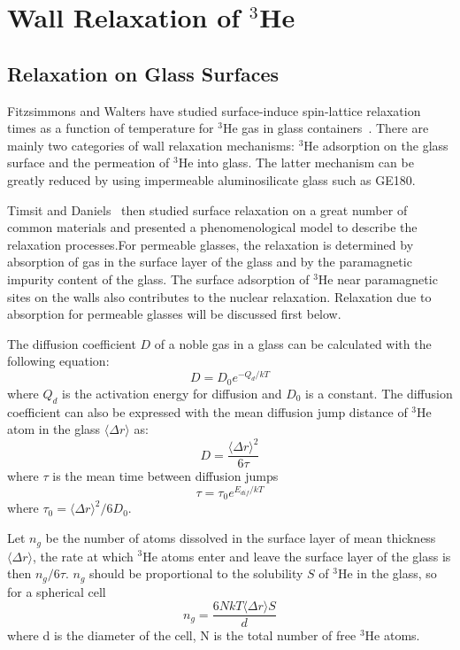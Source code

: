 \section{Wall Relaxation of $^{3}$He}

\subsection{Relaxation on Glass Surfaces}

Fitzsimmons and Walters have studied surface-induce spin-lattice relaxation times as a function of temperature for $^{3}$He gas in glass containers~\cite{PhysRev.179.156}. There are mainly two categories of wall relaxation mechanisms: $^{3}$He adsorption on the glass surface and the permeation of $^{3}$He into glass. The latter mechanism can be greatly reduced by using impermeable aluminosilicate glass such as GE180. 

Timsit and Daniels~\cite{Timsit} then studied surface relaxation on a great number of common materials and presented a phenomenological model to describe the relaxation processes.For permeable glasses, the relaxation is determined by absorption of gas in the surface layer of the glass and by the paramagnetic impurity content of the glass. The surface adsorption of $^{3}$He near paramagnetic sites on the walls also contributes to the nuclear relaxation. Relaxation due to absorption for permeable glasses will be discussed first below.

The diffusion coefficient $D$ of a noble gas in a glass can be calculated with the following equation:
\begin{equation}\label{D}
D=D_{0}e^{-Q_{d}/kT}
\end{equation}
where $Q_{d}$ is the activation energy for diffusion and $D_{0}$ is a constant. The diffusion coefficient can also be expressed with the mean diffusion jump distance of $^{3}$He atom in the glass $\langle\Delta r\rangle$ as:
\begin{equation}
D=\frac{\langle\Delta r\rangle^{2}}{6\tau}
\end{equation}
where $\tau$ is the mean time between diffusion jumps
\begin{equation}\label{residence_time}
\tau=\tau_{0}e^{E_{dif}/kT}
\end{equation}
where $\tau_{0}=\langle\Delta r\rangle^{2}/6D_{0}$.

Let $n_{g}$ be the number of atoms dissolved in the surface layer of mean thickness $\langle\Delta r\rangle$, the rate at which $^{3}$He atoms enter and leave the surface layer of the glass is then $n_{g}/6\tau$. $n_{g}$ should be proportional to the solubility $S$ of $^{3}$He in the glass, so for a spherical cell
\begin{equation}\label{absorption_ng}
n_{g}=\frac{6NkT\langle\Delta r\rangle S}{d}
\end{equation}
where d is the diameter of the cell, N is the total number of free $^{3}$He atoms.

